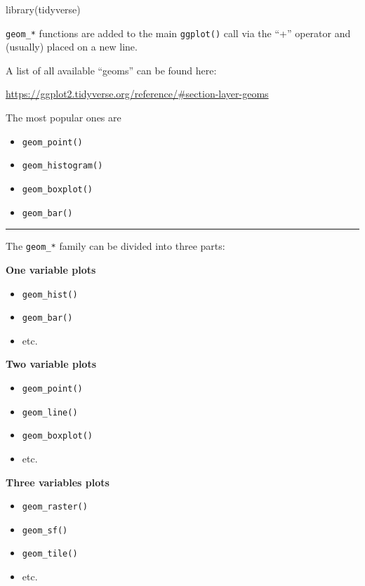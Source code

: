 \documentclass[]{book}
\newenvironment{Shaded}{}{}
\newcommand{\KeywordTok}[1]{\textcolor[rgb]{0.00,0.00,1.00}{#1}}
\newcommand{\NormalTok}[1]{#1}
\providecommand{\tightlist}{%
  \setlength{\itemsep}{0pt}\setlength{\parskip}{0pt}}
\begin{document}
\begin{Shaded}
\begin{Highlighting}[]
\KeywordTok{library}\NormalTok{(tidyverse)}
\end{Highlighting}
\end{Shaded}

\texttt{geom\_*} functions are added to the main \texttt{ggplot()} call via the ``+'' operator and
(usually) placed on a new line.

A list of all available ``geoms'' can be found here:

\url{https://ggplot2.tidyverse.org/reference/\#section-layer-geoms}

The most popular ones are

\begin{itemize}
\item
  \texttt{geom\_point()}
\item
  \texttt{geom\_histogram()}
\item
  \texttt{geom\_boxplot()}
\item
  \texttt{geom\_bar()}
\end{itemize}

\begin{center}\rule{0.5\linewidth}{\linethickness}\end{center}

The \texttt{geom\_*} family can be divided into three parts:

\textbf{One variable plots}

\begin{itemize}
\tightlist
\item
  \texttt{geom\_hist()}
\item
  \texttt{geom\_bar()}
\item
  etc.
\end{itemize}

\textbf{Two variable plots}

\begin{itemize}
\tightlist
\item
  \texttt{geom\_point()}
\item
  \texttt{geom\_line()}
\item
  \texttt{geom\_boxplot()}
\item
  etc.
\end{itemize}

\textbf{Three variables plots}

\begin{itemize}
\tightlist
\item
  \texttt{geom\_raster()}
\item
  \texttt{geom\_sf()}
\item
  \texttt{geom\_tile()}
\item
  etc.
\end{itemize}
\end{document}
